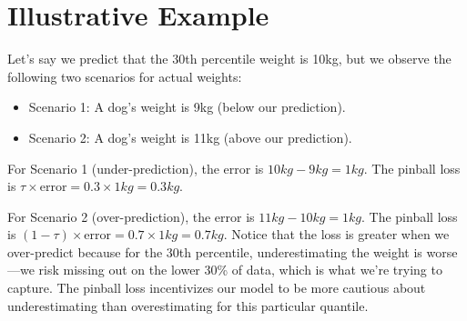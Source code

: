 \documentclass{article}
\begin{document}
\section{Illustrative Example}
Let's say we predict that the 30th percentile weight is 10kg, but we observe the following two scenarios for actual weights:

\begin{itemize}
    \item Scenario 1: A dog's weight is 9kg (below our prediction).
    \item Scenario 2: A dog's weight is 11kg (above our prediction).
\end{itemize}

For Scenario 1 (under-prediction), the error is \( 10kg - 9kg = 1kg \). The pinball loss is \( \tau \times \text{error} = 0.3 \times 1kg = 0.3kg \).

For Scenario 2 (over-prediction), the error is \( 11kg - 10kg = 1kg \). The pinball loss is \( (1 - \tau) \times \text{error} = 0.7 \times 1kg = 0.7kg \).
\newline
Notice that the loss is greater when we over-predict because for the 30th percentile, underestimating the weight is worse—we risk missing out on the lower 30\% of data, which is what we're trying to capture. The pinball loss incentivizes our model to be more cautious about underestimating than overestimating for this particular quantile.
\end{document}

